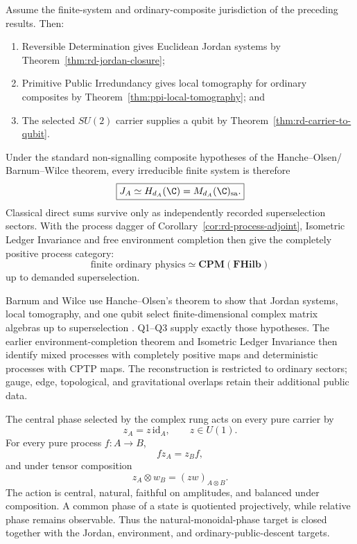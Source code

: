\begin{theorem}
\label{thm:rd-complex-quantum-reconstruction}
Assume the finite-system and ordinary-composite jurisdiction of the preceding
results.  Then:
\begin{enumerate}[label=\textup{Q\arabic*},leftmargin=2.4em]
\item Reversible Determination gives Euclidean Jordan systems by
      Theorem~\ref{thm:rd-jordan-closure};
\item Primitive Public Irredundancy gives local tomography for ordinary composites
      by Theorem~\ref{thm:ppi-local-tomography}; and
\item The selected $SU(2)$ carrier supplies a qubit by
      Theorem~\ref{thm:rd-carrier-to-qubit}.
\end{enumerate}
Under the standard non-signalling composite hypotheses of the Hanche--Olsen/
Barnum--Wilce theorem, every irreducible finite system is therefore
\[
 \boxed{J_A\simeq H_{d_A}(\C)=M_{d_A}(\C)_{\mathrm{sa}}.}
\]
Classical direct sums survive only as independently recorded superselection sectors.
With the process dagger of Corollary~\ref{cor:rd-process-adjoint}, Isometric Ledger
Invariance and free environment completion then give the completely positive process
category:
\[
 \boxed{
 \text{finite ordinary physics}
 \simeq
 \mathbf{CPM}(\mathbf{FHilb})
 }
\]
up to demanded superselection.
\end{theorem}

\begin{proofsketch}
Barnum and Wilce use Hanche--Olsen's theorem to show that Jordan systems, local
tomography, and one qubit select finite-dimensional complex matrix algebras up to
superselection \cite{barnum-wilce-local}.  Q1--Q3 supply exactly those hypotheses.
The earlier environment-completion theorem and Isometric Ledger Invariance then
identify mixed processes with completely positive maps and deterministic processes
with CPTP maps.  The reconstruction is restricted to ordinary sectors; gauge,
edge, topological, and gravitational overlaps retain their additional public data.
\end{proofsketch}

\begin{corollary}
\label{cor:rd-natural-phase}
The central phase selected by the complex rung acts on every pure carrier by
\[
 z_A=z\,\mathrm{id}_A,
 \qquad z\in U(1).
\]
For every pure process $f:A\to B$,
\[
 fz_A=z_Bf,
\]
and under tensor composition
\[
 z_A\otimes w_B=(zw)_{A\otimes B}.
\]
The action is central, natural, faithful on amplitudes, and balanced under
composition.  A common phase of a state is quotiented projectively, while relative
phase remains observable.  Thus the natural-monoidal-phase target is closed together
with the Jordan, environment, and ordinary-public-descent targets.
\end{corollary}

